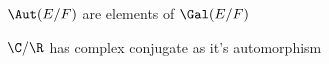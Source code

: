 

\begin{definition}
    \label{def:galois group}
    \(\Aut(E/F)\) are elements of \(\Gal(E/F)\)
\end{definition}
\begin{example}
    \(\C/\R\) has complex conjugate as it's automorphism  
\end{example}




